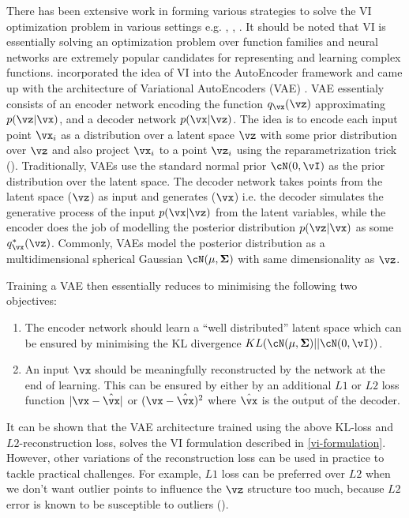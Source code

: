 There has been extensive work in forming various strategies to solve the VI optimization problem in various settings e.g. \cite{Zhang2019}, \cite{Ingraham2017}, \cite{Bouchard-Cote2010}. It should be noted that VI is essentially solving an optimization problem over function families and neural networks are extremely popular candidates for representing and learning complex functions. \cite{Kingma2014} incorporated the idea of VI into the AutoEncoder framework and came up with the architecture of Variational AutoEncoders (VAE)  .  VAE essentialy consists of an encoder network encoding the   function $q_\vx(\vz)$ approximating $p(\vz|\vx)$, and a decoder network $p(\vx|\vz)$. The idea is to encode each input point $\vx_i$ as a distribution over a latent space $\vz$ with some prior distribution over $\vz$ and also project $\vx_i$ to a point $\vz_i$ using the reparametrization trick (\cite{Kingma2014}). Traditionally, VAEs use the standard  normal prior $\cN(0,\vI)$ as the prior distribution over the latent space. The decoder network takes points from the latent space ($\vz$) as input and generates ($\vx$) i.e. the decoder simulates the generative process of the input $p(\vx|\vz)$ from the latent variables, while the encoder does the job of modelling the posterior distribution $p(\vz|\vx)$ as some $q^*_\vx(\vz)$.  Commonly, VAEs model the posterior distribution as a multidimensional spherical Gaussian $\cN(\mathbf{\mu},\mathbf{\Sigma})$ with same dimensionality as $\vz$.  

Training a VAE then essentially reduces to minimising the following  two objectives:
\begin{enumerate}

 
 \item  The encoder network should learn a ``well distributed'' latent space which can be ensured by minimising the KL divergence $KL(\cN(\mathbf{\mu},\mathbf{\Sigma}) || \cN(0,\vI)) $.
 \item An input $\vx$ should be meaningfully reconstructed by the network at the end of learning. This can be ensured by either by an additional $L1$ or $L2$ loss function $|\vx - \hat{\vx}|$ or $(\vx - \hat{\vx})^2$ where $\hat{\vx}$ is the output of the decoder. 
\end{enumerate}
It can be shown that the VAE architecture trained using the above KL-loss and $L2$-reconstruction loss, solves the VI formulation described in \eqref{vi-formulation}. However, other variations of the reconstruction loss can be used in practice to tackle practical challenges. For example, $L1$ loss can be preferred over $L2$ when we don't want outlier points to influence the $\vz$ structure too much, because $L2$ error is known to be susceptible to outliers (\cite{botchkarev2018performance}).
